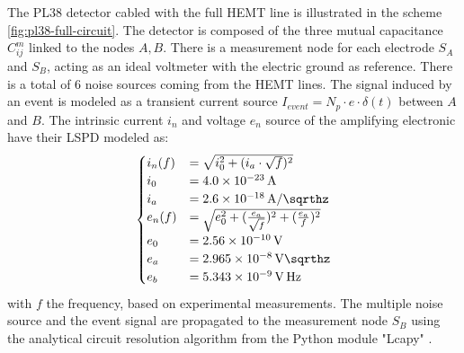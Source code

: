 The PL38 detector cabled with the full HEMT line is illustrated in the scheme \ref{fig:pl38-full-circuit}. The detector is composed of the three mutual capacitance $C_{ij}^m$ linked to the nodes $A,B$. There is a measurement node for each electrode $S_A$ and $S_B$, acting as an ideal voltmeter with the electric ground as reference. There is a total of 6 noise sources coming from the HEMT lines. The signal induced by an event is modeled as a transient current source $I_{event}=N_p \cdot e \cdot \delta(t)$ between $A$ and $B$. The intrinsic current $i_n$ and voltage $e_n$ source of the amplifying electronic have their LSPD modeled as:
\begin{equation}
\begin{cases}
i_n(f) &= \sqrt{ i_0^2 +(i_a \cdot \sqrt{f})^2 } \\
i_0 &= \SI{4.0e-23}{\ampere} \\
i_a &= \SI[per-mode=symbol]{2.6e-18}{\ampere\per\sqrthz} \\
e_n(f) &= \sqrt{ e_0^2 +(\frac{e_a}{\sqrt{f}})^2 +(\frac{e_a}{f})^2} \\
e_0 &= \SI{2.56e-10}{\volt} \\
e_a &= \SI[per-mode=symbol]{2.965e-8}{\volt\sqrthz} \\
e_b &= \SI[per-mode=symbol]{5.343e-9}{\volt\Hz}
\end{cases}
\end{equation}
with $f$ the frequency, based on experimental measurements.
The multiple noise source and the event signal are propagated to the measurement node $S_B$ using the analytical circuit resolution algorithm from the Python module "Lcapy" \cite{lcapy}.

